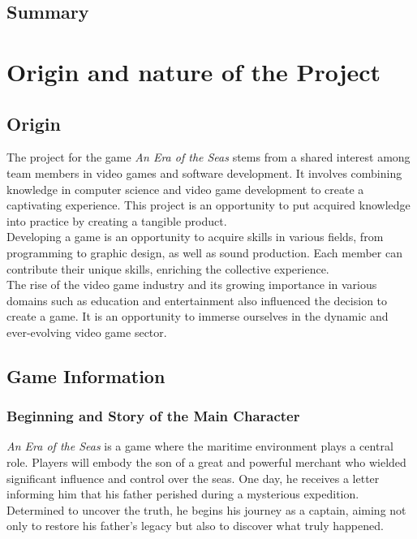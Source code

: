 \documentclass{article}
\begin{document}
\newpage
\subsection*{Summary}
\tableofcontents















\newpage
\section{Origin and nature of the Project}
\subsection{Origin}\hfill

The project for the game \textit{An Era of the Seas} stems from a shared interest among team members in video games and software development. It involves combining knowledge in computer science and video game development to create a captivating experience. This project is an opportunity to put acquired knowledge into practice by creating a tangible product.\\

Developing a game is an opportunity to acquire skills in various fields, from programming to graphic design, as well as sound production. Each member can contribute their unique skills, enriching the collective experience.\\

The rise of the video game industry and its growing importance in various domains such as education and entertainment also influenced the decision to create a game. It is an opportunity to immerse ourselves in the dynamic and ever-evolving video game sector.





\subsection{Game Information} 
\subsubsection{Beginning and Story of the Main Character}\hfill

\textit{An Era of the Seas} is a game where the maritime environment plays a central role. Players will embody the son of a great and powerful merchant who wielded significant influence and control over the seas. One day, he receives a letter informing him that his father perished during a mysterious expedition. Determined to uncover the truth, he begins his journey as a captain, aiming not only to restore his father's legacy but also to discover what truly happened.\\
\end{document}
